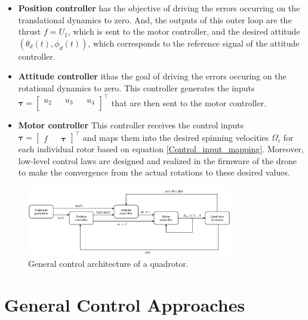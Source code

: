 \documentclass{thesisreport}
\begin{document}
\begin{itemize}
	\setlength{\itemindent}{-.5in}
	\item [] \textbf{Position controller} has the objective of driving the errors occurring on the translational dynamics to zero.
		And, the outputs of this outer loop are the thrust $f=U_1$, which is sent to the motor controller, and the desired attitude $(\theta_d(t),\phi_d(t))$, which corresponds to the reference signal of the attitude controller.
	\item [] \textbf{Attitude controller} ithas the goal of driving the errors occuring on the rotational dynamics to zero. This controller generates the inputs 
	$\bm{\tau}=\begin{bmatrix}
	u_2 && u_3 && u_4 \\
	\end{bmatrix}^{\intercal}
	$
	that are then sent to the motor controller.
	\item [] \textbf{Motor controller} This controller receives the control inputs 	$\bm{\tau}=\begin{bmatrix}
	f && \bm{\tau}
	\end{bmatrix}^{\intercal}
	$ and maps them into the desired spinning velocities $\Omega_i$ for each individual rotor based on equation \ref{Control_input_mapping}. Moreover, low-level control laws are designed and realized in the firmware of the drone to make the convergence from the actual rotations to these desired values.
\end{itemize}
 

 
 \begin{figure}[h]
 \centering
 \includegraphics[width=0.8\textwidth]{Images/Control/General_control_architecture}
 \caption{General control architecture of a quadrotor.}
 \label{General_control_architecture}
 \end{figure}
 
 
 
 \newpage 
 \section{General Control Approaches}
\end{document}

